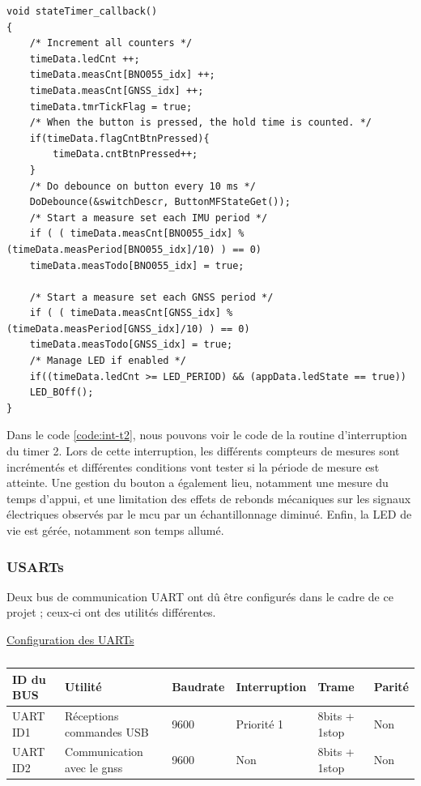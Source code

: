 \begin{code}
\caption{Interruption \textbf{timer 2}, 10 [$ms$]}
\label{code:int-t2}
\begin{verbatim}
void stateTimer_callback()
{
	/* Increment all counters */
	timeData.ledCnt ++;
	timeData.measCnt[BNO055_idx] ++;
	timeData.measCnt[GNSS_idx] ++;
	timeData.tmrTickFlag = true;
	/* When the button is pressed, the hold time is counted. */
	if(timeData.flagCntBtnPressed){
		timeData.cntBtnPressed++;
	}
	/* Do debounce on button every 10 ms */
	DoDebounce(&switchDescr, ButtonMFStateGet());
	/* Start a measure set each IMU period */        
	if ( ( timeData.measCnt[BNO055_idx] % (timeData.measPeriod[BNO055_idx]/10) ) == 0)
	timeData.measTodo[BNO055_idx] = true;
	
	/* Start a measure set each GNSS period */        
	if ( ( timeData.measCnt[GNSS_idx] % (timeData.measPeriod[GNSS_idx]/10) ) == 0)
	timeData.measTodo[GNSS_idx] = true;
	/* Manage LED if enabled */
	if((timeData.ledCnt >= LED_PERIOD) && (appData.ledState == true))
	LED_BOff();
} 
\end{verbatim}
\end{code}	

Dans le code \ref{code:int-t2}, nous pouvons voir le code de la routine d'interruption du timer 2. Lors de cette interruption, les différents compteurs de mesures sont incrémentés et différentes conditions vont tester si la période de mesure est atteinte. Une gestion du bouton a également lieu, notamment une mesure du temps d'appui, et une limitation des effets de rebonds mécaniques sur les signaux électriques observés par le \gls{mcu} par un échantillonnage diminué. Enfin, la LED de vie est gérée, notamment son temps allumé.

\clearpage

\subsubsection{USARTs}

Deux bus de communication UART ont dû être configurés dans le cadre de ce projet ; ceux-ci ont des utilités différentes.

\begin{center}
	\underline{Configuration des UARTs}
	\begin{table}[h]
		\centering
		\begin{tabular}{llllll}
			ID du BUS & Utilité & Baudrate & Interruption & Trame & Parité \\ 
			\hline
			UART ID1 & Réceptions commandes USB & 9600 & Priorité 1 & 8bits + 1stop & Non \\
			UART ID2 & Communication avec le \gls{gnss} & 9600 & Non & 8bits + 1stop & Non \\
		\end{tabular}
		\caption{}
		\label{tab:Usarts}
	\end{table}
\end{center}

